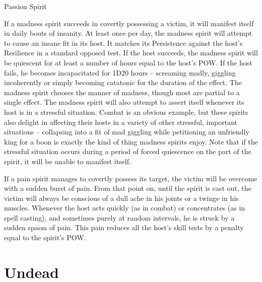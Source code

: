 \begin{monsterbox}{Passion Spirit}
\begin{rpg-monsteraction}
		If a madness spirit succeeds in covertly possessing a victim, it will manifest itself in daily bouts of insanity. At least once per day, the madness spirit will attempt to cause an insane fit in its host. It matches its Persistence against the host’s Resilience in a standard opposed test. If the host succeeds, the madness spirit will be quiescent for at least a number of hours equal to the host’s POW. If the host fails, he becomes incapacitated for 1D20 hours – screaming madly, giggling incoherently or simply becoming catatonic for the duration of the effect. The madness spirit chooses the manner of madness, though most are partial to a single effect. The madness spirit will also attempt to assert itself whenever its host is in a stressful situation. Combat is an obvious example, but these spirits also delight in affecting their hosts in a variety of other stressful, important situations – collapsing into a fit of mad giggling while petitioning an unfriendly king for a boon is exactly the kind of thing madness spirits enjoy. Note that if the stressful situation occurs during a period of forced quiescence on the part of the spirit, it will be unable to manifest itself.
	\end{rpg-monsteraction}
	\begin{rpg-monsteraction}
		If a pain spirit manages to covertly possess its target, the victim will be overcome with a sudden burst of pain. From that point on, until the spirit is cast out, the victim will always be conscious of a dull ache in his joints or a twinge in his muscles. Whenever the host acts quickly (as in combat) or concentrates (as in spell casting), and sometimes purely at random intervals, he is struck by a sudden spasm of pain. This pain reduces all the host’s skill tests by a penalty equal to the spirit’s POW.
	\end{rpg-monsteraction}
\end{monsterbox}


\section{Undead}
\label{sec:undead}




